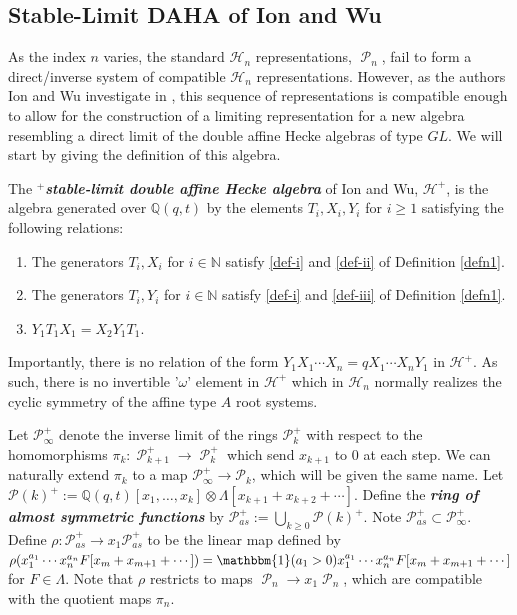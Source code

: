 \documentclass[ALCO,Unicode]{cedram}
\DeclareMathOperator{\sP}{\mathscr{P} }
\begin{document}
\subsection{Stable-Limit DAHA of Ion and Wu}
As the index $n$ varies, the standard $\mathscr{H}_n$ representations, $\sP_n$, fail to form a direct/inverse system of compatible $\mathscr{H}_n$ representations. However, as the authors Ion and Wu investigate in \cite{Ion_2022}, this sequence of representations is compatible enough to allow for the construction of a limiting representation for a new algebra resembling a direct limit of the double affine Hecke algebras of type $GL$. We will start by giving the definition of this algebra.


\begin{defi} \label{defn4}
The \textit{\textbf{$^+$stable-limit double affine Hecke algebra}} of Ion and Wu, $\mathscr{H}^{+}$, is the algebra  generated over $\mathbb{Q}(q,t)$ by the elements $T_i,X_i,Y_i$ for $i \geq 1$ satisfying the following relations:

\begin{center}
\begin{enumerate}
    \item The generators $T_i,X_i$ for $i \in \mathbb{N}$ satisfy 
    \eqref{def-i}  and \eqref{def-ii}
    of Definition \ref{defn1}.
    \item The generators $T_i,Y_i$ for $i \in \mathbb{N}$ satisfy 
    \eqref{def-i} and \eqref{def-iii}
    of Definition \ref{defn1}.
    \item  $Y_1T_1X_1 = X_2Y_1T_1.$
 \end{enumerate}
 \end{center}
 \end{defi}

Importantly, there is no relation of the form $Y_1X_1\cdots X_n = q X_1\cdots X_n Y_1$ in $\mathscr{H}^{+}$. As such, there is no invertible '$\omega$' element in $\mathscr{H}^{+}$ which in $\mathscr{H}_n$ normally realizes the cyclic symmetry of the affine type $A$ root systems.


\begin{defi} \label{defn5}
 Let $\mathscr{P}_{\infty}^{+}$ denote the inverse limit of the rings $\mathscr{P}_{k}^{+}$ with respect to the homomorphisms $\pi_k: \sP_{k+1}^{+} \rightarrow \sP_k^{+}$ which send $x_{k+1}$ to 0 at each step. We can naturally extend $\pi_k$ to a map $\mathscr{P}_{\infty}^{+} \rightarrow \mathscr{P}_k$, which will be given the same name. Let $\mathscr{P}(k)^{+} := \mathbb{Q}(q,t)[x_1,\ldots,x_k]\otimes \Lambda[x_{k+1}+x_{k+2}+ \cdots]$. Define the \textbf{\textit{ring of almost symmetric functions}} by $\mathscr{P}_{as}^{+} := \bigcup_{k\geq 0} \mathscr{P}(k)^{+}$. Note $\mathscr{P}_{as}^{+} \subset \mathscr{P}_{\infty}^{+}.$ Define $\rho: \mathscr{P}_{as}^{+} \rightarrow x_1\mathscr{P}_{as}^{+}$ to be the linear map defined by $\rho(x_1^{a_1}\cdots x_n^{a_n}F[x_{m}+x_{m+1}+ \cdots]) = \mathbbm{1}(a_1 > 0) x_1^{a_1}\cdots x_n^{a_n}F[x_{m}+x_{m+1}+ \cdots] $ for $F \in \Lambda$. Note that $\rho$ restricts to maps $\sP_n \rightarrow x_1\sP_n$, which are compatible with the quotient maps $\pi_n$.
 \end{defi}
\end{document}

